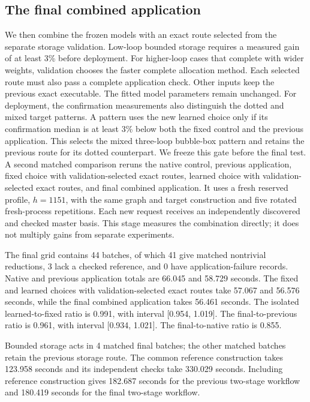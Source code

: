 \subsection{The final combined application}
We then combine the frozen models with an exact route selected from the separate storage validation. Low-loop bounded storage requires a measured gain of at least 3\% before deployment. For higher-loop cases that complete with wider weights, validation chooses the faster complete allocation method. Each selected route must also pass a complete application check. Other inputs keep the previous exact executable. The fitted model parameters remain unchanged. For deployment, the confirmation measurements also distinguish the dotted and mixed target patterns. A pattern uses the new learned choice only if its confirmation median is at least 3\% below both the fixed control and the previous application. This selects the mixed three-loop bubble-box pattern and retains the previous route for its dotted counterpart. We freeze this gate before the final test. A second matched comparison reruns the native control, previous application, fixed choice with validation-selected exact routes, learned choice with validation-selected exact routes, and final combined application. It uses a fresh reserved profile, $h=1151$, with the same graph and target construction and five rotated fresh-process repetitions. Each new request receives an independently discovered and checked master basis. This stage measures the combination directly; it does not multiply gains from separate experiments.

The final grid contains 44 batches, of which 41 give matched nontrivial reductions, 3 lack a checked reference, and 0 have application-failure records. Native and previous application totals are 66.045 and 58.729 seconds. The fixed and learned choices with validation-selected exact routes take 57.067 and 56.576 seconds, while the final combined application takes 56.461 seconds. The isolated learned-to-fixed ratio is 0.991, with interval [0.954, 1.019]. The final-to-previous ratio is 0.961, with interval [0.934, 1.021]. The final-to-native ratio is 0.855.

Bounded storage acts in 4 matched final batches; the other matched batches retain the previous storage route. The common reference construction takes 123.958 seconds and its independent checks take 330.029 seconds. Including reference construction gives 182.687 seconds for the previous two-stage workflow and 180.419 seconds for the final two-stage workflow.

